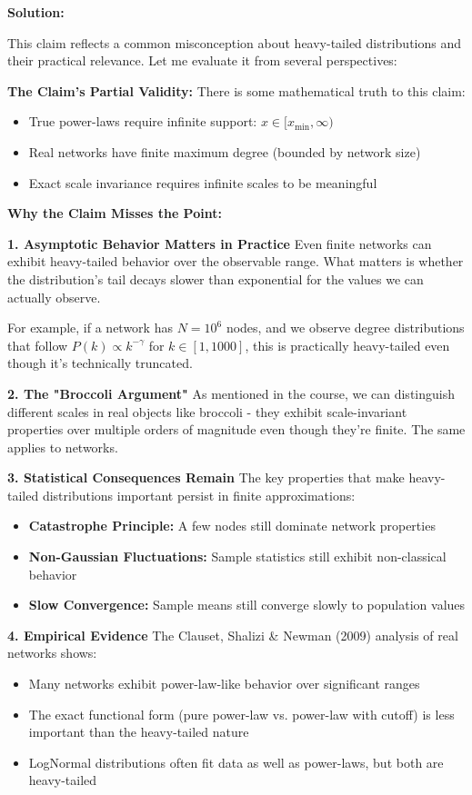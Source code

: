 \documentclass[11pt]{article}
\newenvironment{solution}
{\color{solutioncolor}\begin{framed}\textbf{Solution:}\par}
{\end{framed}}
\begin{document}
\begin{solution}
This claim reflects a common misconception about heavy-tailed distributions and their practical relevance. Let me evaluate it from several perspectives:

\textbf{The Claim's Partial Validity:}
There is some mathematical truth to this claim:
\begin{itemize}
\item True power-laws require infinite support: $x \in [x_{\min}, \infty)$
\item Real networks have finite maximum degree (bounded by network size)
\item Exact scale invariance requires infinite scales to be meaningful
\end{itemize}

\textbf{Why the Claim Misses the Point:}

\textbf{1. Asymptotic Behavior Matters in Practice}
Even finite networks can exhibit heavy-tailed behavior over the observable range. What matters is whether the distribution's tail decays slower than exponential for the values we can actually observe.

For example, if a network has $N = 10^6$ nodes, and we observe degree distributions that follow $P(k) \propto k^{-\gamma}$ for $k \in [1, 1000]$, this is practically heavy-tailed even though it's technically truncated.

\textbf{2. The "Broccoli Argument"}
As mentioned in the course, we can distinguish different scales in real objects like broccoli - they exhibit scale-invariant properties over multiple orders of magnitude even though they're finite. The same applies to networks.

\textbf{3. Statistical Consequences Remain}
The key properties that make heavy-tailed distributions important persist in finite approximations:
\begin{itemize}
\item \textbf{Catastrophe Principle:} A few nodes still dominate network properties
\item \textbf{Non-Gaussian Fluctuations:} Sample statistics still exhibit non-classical behavior
\item \textbf{Slow Convergence:} Sample means still converge slowly to population values
\end{itemize}

\textbf{4. Empirical Evidence}
The Clauset, Shalizi & Newman (2009) analysis of real networks shows:
\begin{itemize}
\item Many networks exhibit power-law-like behavior over significant ranges
\item The exact functional form (pure power-law vs. power-law with cutoff) is less important than the heavy-tailed nature
\item LogNormal distributions often fit data as well as power-laws, but both are heavy-tailed
\end{itemize}


\end{solution}
\end{document}
